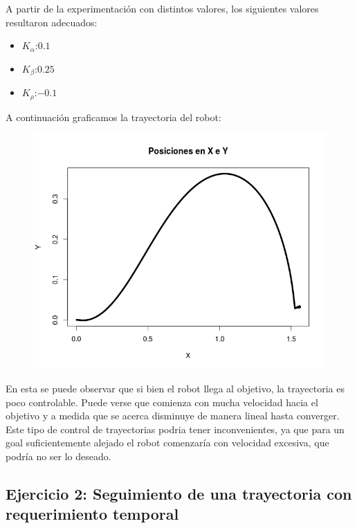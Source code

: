 \newpage

A partir de la experimentación con distintos valores, los siguientes valores resultaron adecuados:  %

\begin{itemize}
\item $K_\alpha$:$0.1$
\item $K_\beta$:$0.25$
\item $K_\rho$:$-0.1$
\end{itemize}


A continuación graficamos la trayectoria del robot:

\begin{figure}[!h]
\begin{center}
\includegraphics[scale=0.5]{ejercicio1b}
\end{center}
\end{figure}


En esta se puede observar que si bien el robot llega al objetivo, la trayectoria es poco controlable. Puede verse que comienza con mucha velocidad hacia el objetivo y a medida que se acerca disminuye de manera lineal hasta converger. Este tipo de control de trayectorias podria tener inconvenientes, ya que para un goal suficientemente alejado el robot comenzaría con velocidad excesiva, que podría no ser lo deseado.

\subsection{Ejercicio 2: Seguimiento de una trayectoria con requerimiento temporal}

